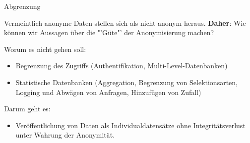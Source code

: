 \begin{frame}{Abgrenzung}
	\begin{center}
		Vermeintlich anonyme Daten stellen sich als nicht anonym heraus. \textbf{Daher}: Wie können wir Aussagen über die "'Güte"' der Anonymisierung machen?
	\end{center}

	\vspace{0.5cm}
	\pause
	
	Worum es nicht gehen soll:
	
	\begin{itemize}
		\item Begrenzung des Zugriffs (Authentifikation, Multi-Level-Datenbanken)
		\item Statistische Datenbanken (Aggregation, Begrenzung von Selektionsarten, Logging und Abwägen von Anfragen, Hinzufügen von Zufall)
	\end{itemize}
	
	Darum geht es:
	
	\begin{itemize}
		\item Veröffentlichung von Daten als Individualdatensätze ohne Integritätsverlust unter Wahrung der Anonymität.
	\end{itemize}
\end{frame}
